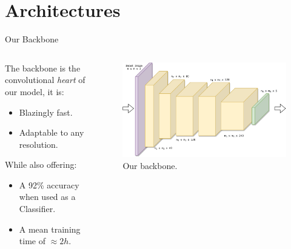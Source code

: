 \documentclass[english]{beamer}
\begin{document}
\section{Architectures}
\begin{frame}{Our Backbone}
  \begin{columns}
    
    \begin{column}{0.5\textwidth}
      The backbone is the convolutional \emph{heart} of our model, it is:
      \begin{itemize}
        \item Blazingly fast.
        \item Adaptable to any resolution.
      \end{itemize}
      While also offering:
      \begin{itemize}
        \item A 92\% accuracy when used as a Classifier.
        \item A mean training time of $\approx2h$.
      \end{itemize}
    \end{column}

    \begin{column}{0.5\textwidth}
      \begin{figure}
        \centering
            \includegraphics[width=1.0\textwidth]{images/backbone.pdf}
            \caption{Our backbone.}
        \end{figure}
    \end{column}

  \end{columns}
\end{frame}
\end{document}
